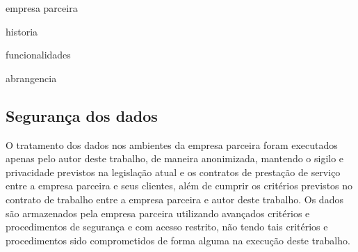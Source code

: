 empresa parceira

historia

funcionalidades

abrangencia

\subsection{Segurança dos dados}

O tratamento dos dados nos ambientes da empresa parceira foram executados apenas pelo autor deste trabalho, de maneira anonimizada, mantendo o sigilo e privacidade previstos na legislação atual e os contratos de prestação de serviço entre a empresa parceira e seus clientes, além de cumprir os critérios previstos no contrato de trabalho entre a empresa parceira e autor deste trabalho. Os dados são armazenados pela empresa parceira utilizando avançados critérios e procedimentos de segurança e com acesso restrito, não tendo tais critérios e procedimentos sido comprometidos de forma alguma na execução deste trabalho.
